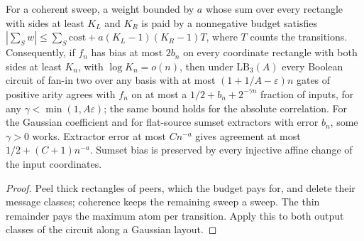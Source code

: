 \begin{theorem}
  \label{thm:lowerbounds-frontier-average-case}
  \leanok
  For a coherent sweep, a weight bounded by $a$ whose sum over every rectangle
  with sides at least $K_L$ and $K_R$ is paid by a nonnegative budget satisfies
  $|\sum_S w|\le\sum_S\mathrm{cost}+a(K_L-1)(K_R-1)T$, where $T$ counts the
  transitions. Consequently, if $f_n$ has bias at most $2b_n$ on every coordinate
  rectangle with both sides at least $K_n$, with $\log K_n=o(n)$, then under
  $\mathrm{LB}_3(A)$ every Boolean circuit of fan-in two over any basis with at
  most $(1+1/A-\varepsilon)n$ gates of positive arity agrees with $f_n$ on at most
  a $1/2+b_n+2^{-\gamma n}$ fraction of inputs, for any $\gamma<\min(1,A\varepsilon)$;
  the same bound holds for the absolute correlation. For the Gaussian coefficient
  and for flat-source sumset extractors with error $b_n$, some $\gamma>0$ works.
  Extractor error at most $Cn^{-a}$ gives agreement at most $1/2+(C+1)n^{-a}$.
  Sumset bias is preserved by every injective affine change of the input
  coordinates.
\end{theorem}
\begin{proof}
  \leanok
  Peel thick rectangles of peers, which the budget pays for, and delete their
  message classes; coherence keeps the remaining sweep a sweep. The thin remainder
  pays the maximum atom per transition. Apply this to both output classes of the
  circuit along a Gaussian layout.
\end{proof}

